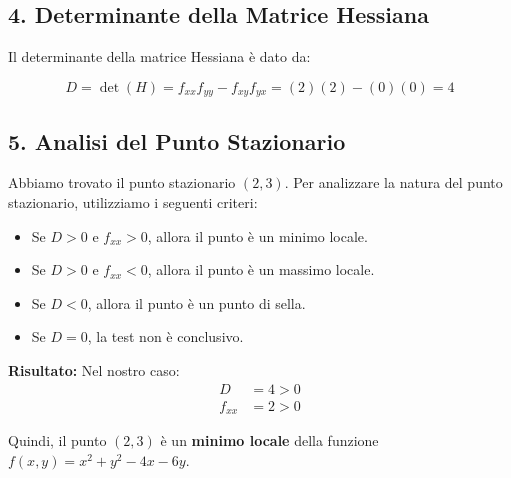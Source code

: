 \documentclass{article}
\begin{document}
\subsection*{4. Determinante della Matrice Hessiana}

Il determinante della matrice Hessiana è dato da:

\[
D = \det(H) = f_{xx} f_{yy} - f_{xy} f_{yx} = (2)(2) - (0)(0) = 4
\]

\subsection*{5. Analisi del Punto Stazionario}

Abbiamo trovato il punto stazionario \( (2, 3) \). Per analizzare la natura del punto stazionario, utilizziamo i seguenti criteri:

\begin{itemize}
    \item Se \( D > 0 \) e \( f_{xx} > 0 \), allora il punto è un minimo locale.
    \item Se \( D > 0 \) e \( f_{xx} < 0 \), allora il punto è un massimo locale.
    \item Se \( D < 0 \), allora il punto è un punto di sella.
    \item Se \( D = 0 \), la test non è conclusivo.
\end{itemize}

\textbf{Risultato:} Nel nostro caso:
\begin{align*}
D & = 4 > 0 \\
f_{xx} & = 2 > 0
\end{align*}

Quindi, il punto \( (2, 3) \) è un \textbf{minimo locale} della funzione \( f(x, y) = x^2 + y^2 - 4x - 6y \).
\end{document}
